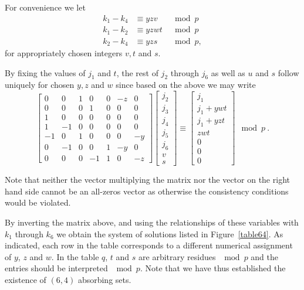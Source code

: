 For convenience we let
\begin{equation}\begin{array}{cccc}
k_1-k_4 &\equiv yzv &\mod p \\
k_1-k_2 &\equiv yzwt &\mod p\\
k_2-k_4 &\equiv yzs &\mod p,
\end{array}\end{equation}
for appropriately chosen integers $v,t$ and $s$.

By fixing the values of $j_1$ and $t$, the rest of $j_2$ through
$j_6$ as well as $u$ and $s$ follow uniquely for chosen $y,z$ and
$w$ since based on the above we may write
\begin{equation}
\left[ \begin{array}{ccccccc} 0 & 0 & 1 & 0 & 0 & -z &0\\
0 & 0 & 0 & 1 & 0 & 0 &0\\
1 & 0 & 0 & 0 & 0 & 0 &0\\
1 & -1 & 0 & 0 & 0 & 0 &0\\
-1 & 0 & 1 & 0 & 0 & 0 &-y\\
0 & -1 & 0 & 0 & 1 & -y &0\\
0 & 0 & 0 & -1 & 1 & 0 & -z
\end{array}\right] \left[\begin{array}{c}
j_2\\j_3\\j_4\\j_5\\j_6\\v\\s\end{array}\right] \equiv
\left[\begin{array}{c}j_1\\j_1+ywt\\j_1+yzt\\zwt\\0\\0\\0\end{array}\right]
\mod p~.
\end{equation}

Note that neither the vector multiplying the matrix nor the vector
on the right hand side cannot be an all-zeros vector as otherwise
the consistency conditions would be violated.

By inverting the matrix above, and using the relationships of these
variables with $k_1$ through $k_6$ we obtain the system of solutions
listed in Figure~\ref{table64}. As indicated, each row in the table
corresponds to a different numerical assignment of $y$, $z$ and $w$.
In the table $q$, $t$ and $s$ are arbitrary residues $\mod p$ and
the entries should be interpreted $\mod p$. Note that we have thus
established the existence of $(6,4)$ absorbing sets.

